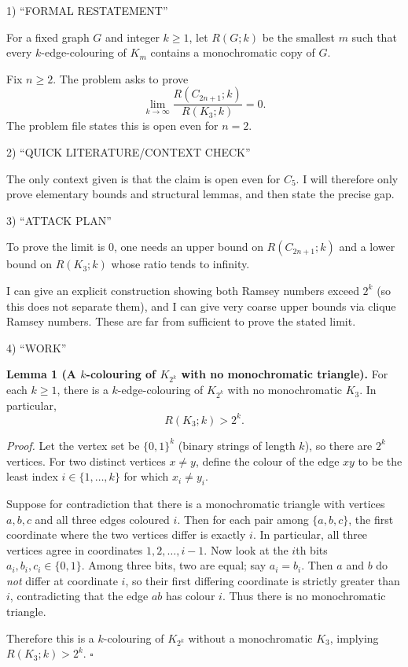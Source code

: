 1) “FORMAL RESTATEMENT”

For a fixed graph $G$ and integer $k\ge 1$, let $R(G;k)$ be the smallest $m$ such that every $k$-edge-colouring of $K_m$ contains a monochromatic copy of $G$.

Fix $n\ge 2$. The problem asks to prove
\[
\lim_{k\to\infty} \frac{R(C_{2n+1};k)}{R(K_3;k)} = 0.
\]
The problem file states this is open even for $n=2$.

2) “QUICK LITERATURE/CONTEXT CHECK”

The only context given is that the claim is open even for $C_5$. I will therefore only prove elementary bounds and structural lemmas, and then state the precise gap.

3) “ATTACK PLAN”

To prove the limit is $0$, one needs an upper bound on $R(C_{2n+1};k)$ and a lower bound on $R(K_3;k)$ whose ratio tends to infinity.

I can give an explicit construction showing both Ramsey numbers exceed $2^k$ (so this does not separate them), and I can give very coarse upper bounds via clique Ramsey numbers. These are far from sufficient to prove the stated limit.

4) “WORK”

\textbf{Lemma 1 (A $k$-colouring of $K_{2^k}$ with no monochromatic triangle).}
For each $k\ge 1$, there is a $k$-edge-colouring of $K_{2^k}$ with no monochromatic $K_3$. In particular,
\[
R(K_3;k) > 2^k.
\]

\emph{Proof.}
Let the vertex set be $\{0,1\}^k$ (binary strings of length $k$), so there are $2^k$ vertices.
For two distinct vertices $x\neq y$, define the colour of the edge $xy$ to be the least index $i\in\{1,\dots,k\}$ for which $x_i\neq y_i$.

Suppose for contradiction that there is a monochromatic triangle with vertices $a,b,c$ and all three edges coloured $i$. Then for each pair among $\{a,b,c\}$, the first coordinate where the two vertices differ is exactly $i$. In particular, all three vertices agree in coordinates $1,2,\dots,i-1$.
Now look at the $i$th bits $a_i,b_i,c_i\in\{0,1\}$. Among three bits, two are equal; say $a_i=b_i$. Then $a$ and $b$ do \emph{not} differ at coordinate $i$, so their first differing coordinate is strictly greater than $i$, contradicting that the edge $ab$ has colour $i$.
Thus there is no monochromatic triangle.

Therefore this is a $k$-colouring of $K_{2^k}$ without a monochromatic $K_3$, implying $R(K_3;k)>2^k$. $\square$

